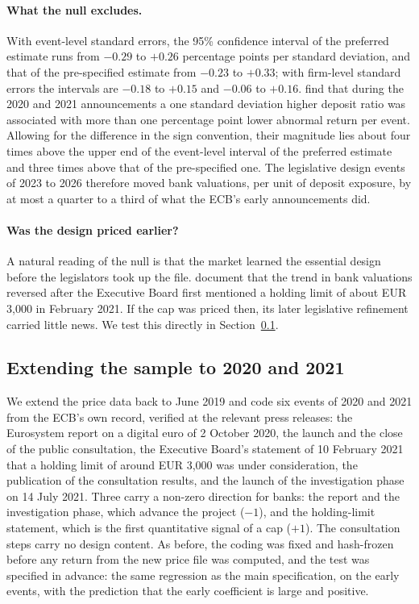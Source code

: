 \documentclass[11pt]{article}
\theoremstyle{plain}\newtheorem{proposition}{Proposition}
\begin{document}
\paragraph{What the null excludes.} With event-level standard errors, the 95\% confidence interval of the preferred estimate runs from $-0.29$ to $+0.26$ percentage points per standard deviation, and that of the pre-specified estimate from $-0.23$ to $+0.33$; with firm-level standard errors the intervals are $-0.18$ to $+0.15$ and $-0.06$ to $+0.16$. \citet{burlon2024} find that during the 2020 and 2021 announcements a one standard deviation higher deposit ratio was associated with more than one percentage point lower abnormal return per event. Allowing for the difference in the sign convention, their magnitude lies about four times above the upper end of the event-level interval of the preferred estimate and three times above that of the pre-specified one. The legislative design events of 2023 to 2026 therefore moved bank valuations, per unit of deposit exposure, by at most a quarter to a third of what the ECB's early announcements did.

\paragraph{Was the design priced earlier?} A natural reading of the null is that the market learned the essential design before the legislators took up the file. \citet{burlon2024} document that the trend in bank valuations reversed after the Executive Board first mentioned a holding limit of about EUR 3,000 in February 2021. If the cap was priced then, its later legislative refinement carried little news. We test this directly in Section~\ref{sec:early}.

\subsection{Extending the sample to 2020 and 2021}\label{sec:early}

We extend the price data back to June 2019 and code six events of 2020 and 2021 from the ECB's own record, verified at the relevant press releases: the Eurosystem report on a digital euro of 2 October 2020, the launch and the close of the public consultation, the Executive Board's statement of 10 February 2021 that a holding limit of around EUR 3,000 was under consideration, the publication of the consultation results, and the launch of the investigation phase on 14 July 2021. Three carry a non-zero direction for banks: the report and the investigation phase, which advance the project ($-1$), and the holding-limit statement, which is the first quantitative signal of a cap ($+1$). The consultation steps carry no design content. As before, the coding was fixed and hash-frozen before any return from the new price file was computed, and the test was specified in advance: the same regression as the main specification, on the early events, with the prediction that the early coefficient is large and positive.
\end{document}

